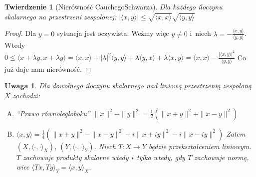 \documentclass[11pt]{mwrep}
\renewcommand{\[}{\begin{equation}}
\renewcommand{\]}{\end{equation}}
\newcommand{\C}{{\ensuremath{\mathbb C}}}
\newtheorem{twr}[subsection]{Twierdzenie}%
\newtheorem{uwaga}[subsection]{Uwaga}
\newcounter{numer}
\begin{document}
\begin{twr}[Nierówność Cauchego\dywiz Schwarza] Dla każdego iloczynu skalarnego na przestrzeni zespolonej:
	$|\langle x,y \rangle| \le \sqrt{\langle x, x \rangle} \sqrt{\langle y, y \rangle}$
\end{twr}
\begin{proof}
	Dla $y=0$ sytuacja jest oczywista. Weźmy więc $y\neq 0$ i~niech $\lambda = -\frac{\langle x,y \rangle}{\langle y,y \rangle}$.
	Wtedy $0\le\langle x+\lambda y,x+\lambda y \rangle = \langle x,x \rangle + |\lambda|^2 \langle y,y \rangle + \lambda\langle y,x \rangle + \overline{\lambda}
	\langle x,y \rangle = \langle x,x \rangle - \frac{|\langle x,y \rangle|^2}{\langle y,y \rangle}$
	Co już daje nam nierówność.
\end{proof}
\begin{uwaga}
	Dla dowolnego iloczynu skalarnego nad liniową przestrzenią  zespoloną $X$ zachodzi:
	\begin{enumerate}[(A)]
		\item ``Prawo równoległoboku'' $\|x\|^2+\|y\|^2 = \frac{1}{2}\left( \|x+y\|^2 + \|x-y\|^2 \right)$ 
		\item $\langle x,y \rangle = \frac{1}{4}\left( \|x+y\|^2 - \|x -  y\|^2  + i \|x+iy\|^2 - i\|x-iy\|^2\right)$
			Zatem $(X,\langle \cdot,\cdot \rangle_X)$, $(Y,\langle \cdot,\cdot \rangle_Y)$. Niech  $T\colon X\to Y$ będzie przekształceniem liniowym. 
			$T$ zachowuje produkty skalarne wtedy i~tylko wtedy, gdy $T$ zachowuje normę, wiec $\langle Tx,Ty \rangle_Y = \langle x,y \rangle_X$.
	\end{enumerate}
\end{uwaga}
\end{document}
